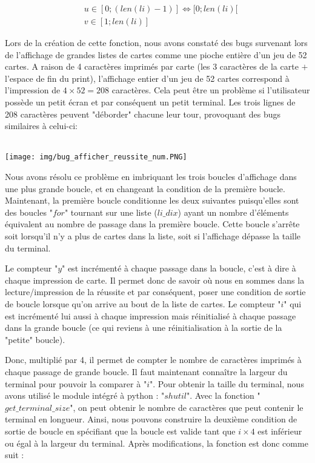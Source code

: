 \documentclass[10pt,a4paper,french,titlepage]{article}
\theoremstyle{definition}
\begin{document}
\begin{align*}
	&u \in [0;(len(li)-1)] \iff [0;len(li)[\\
	&v \in [1;len(li)]
\end{align*}

Lors de la création de cette fonction, nous avons constaté des bugs survenant lors de l'affichage de grandes listes de cartes comme une pioche entière d'un jeu de 52 cartes. A raison de 4 caractères imprimés par carte (les 3 caractères de la carte $+$ l'espace de fin du print), l'affichage entier d'un jeu de 52 cartes correspond à l'impression de $4\times52=208$ caractères. Cela peut être un problème si l'utilisateur possède un petit écran et par conséquent un petit terminal. Les trois lignes de 208 caractères peuvent "déborder" chacune leur tour, provoquant des bugs similaires à celui-ci: \\\\
\begin{center}
\texttt{[image: img/bug\_afficher\_reussite\_num.PNG]}
\end{center}

Nous avons résolu ce problème en imbriquant les trois boucles d'affichage dans une plus grande boucle, et en changeant la condition de la première boucle. Maintenant, la première boucle conditionne les deux suivantes puisqu'elles sont des boucles "$for$" tournant sur une liste ($li\_dix$) ayant un nombre d'éléments équivalent au nombre de passage dans la première boucle. Cette boucle s'arrête soit lorsqu'il n'y a plus de cartes dans la liste, soit si l'affichage dépasse la taille du terminal. 

Le compteur "$y$" est incrémenté à chaque passage dans la boucle, c'est à dire à chaque impression de carte. Il permet donc de savoir où nous en sommes dans la lecture/impression de la réussite et par conséquent, poser une condition de sortie de boucle lorsque qu'on arrive au bout de la liste de cartes. Le compteur "$i$" qui est incrémenté lui aussi à chaque impression mais réinitialisé à chaque passage dans la grande boucle (ce qui reviens à une réinitialisation à la sortie de la "petite" boucle). 

Donc, multiplié par 4, il permet de compter le nombre de caractères imprimés à chaque passage de grande boucle. Il faut maintenant connaître la largeur du terminal pour pouvoir la comparer à "$i$". Pour obtenir la taille du terminal, nous avons utilisé le module intégré à python : "$shutil$". Avec la fonction "$get\_terminal\_size$", on peut obtenir le nombre de caractères que peut contenir le terminal en longueur. Ainsi, nous pouvons construire la deuxième condition de sortie de boucle en spécifiant que la boucle est valide tant que $i \times 4$ est inférieur ou égal à la largeur du terminal. Après modifications, la fonction est donc comme suit :
\end{document}
